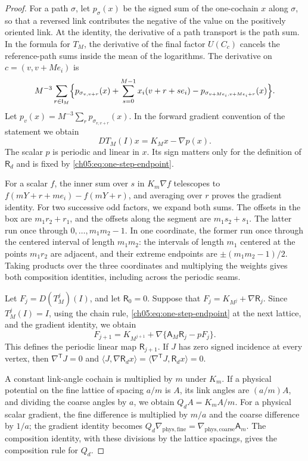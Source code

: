 \begin{proof}
For a path $\sigma$, let $p_\sigma(x)$ be the signed sum of the one-cochain $x$ along $\sigma$, so that a reversed link contributes the negative of the value on the positively oriented link. At the identity, the derivative of a path transport is the path sum. In the formula for $T_M$, the derivative of the final factor $U(C_c)$ cancels the reference-path sums inside the mean of the logarithms. The derivative on $c=(v,v+Me_i)$ is
\[
 M^{-3}\sum_{r\in\mathsf I_M}\Bigl\{p_{\sigma_{v,v+r}}(x)+\sum_{s=0}^{M-1}x_i(v+r+se_i)-p_{\sigma_{v+Me_i,v+Me_i+r}}(x)\Bigr\}.
\]
Let $p_v(x)=M^{-3}\sum_rp_{\sigma_{v,v+r}}(x)$. In the forward gradient convention of the statement we obtain
\begin{equation}\label{ch05:eq:one-step-endpoint}
 DT_M(I)x=K_Mx-\nabla p(x).
\end{equation}
The scalar $p$ is periodic and linear in $x$. Its sign matters only for the definition of $\mathsf R_d$ and is fixed by \eqref{ch05:eq:one-step-endpoint}.

For a scalar $f$, the inner sum over $s$ in $K_m\nabla f$ telescopes to $f(mY+r+me_i)-f(mY+r)$, and averaging over $r$ proves the gradient identity. For two successive odd factors, we expand both sums. The offsets in the box are $m_1r_2+r_1$, and the offsets along the segment are $m_1s_2+s_1$. The latter run once through $0,\ldots,m_1m_2-1$. In one coordinate, the former run once through the centered interval of length $m_1m_2$: the intervals of length $m_1$ centered at the points $m_1r_2$ are adjacent, and their extreme endpoints are $\pm(m_1m_2-1)/2$. Taking products over the three coordinates and multiplying the weights gives both composition identities, including across the periodic seams.

Let $F_j=D(T_M^j)(I)$, and let $\mathsf R_0=0$. Suppose that $F_j=K_{M^j}+\nabla\mathsf R_j$. Since $T_M^j(I)=I$, using the chain rule, \eqref{ch05:eq:one-step-endpoint} at the next lattice, and the gradient identity, we obtain
\[
 F_{j+1}=K_{M^{j+1}}+\nabla\{\mathsf A_M\mathsf R_j-pF_j\}.
\]
This defines the periodic linear map $\mathsf R_{j+1}$. If $J$ has zero signed incidence at every vertex, then $\nabla^{\mathsf T}J=0$ and $\langle J,\nabla\mathsf R_dx\rangle=\langle\nabla^{\mathsf T}J,\mathsf R_dx\rangle=0$.

A constant link-angle cochain is multiplied by $m$ under $K_m$. If a physical potential on the fine lattice of spacing $a/m$ is $A$, its link angles are $(a/m)A$, and dividing the coarse angles by $a$, we obtain $Q_dA=K_mA/m$. For a physical scalar gradient, the fine difference is multiplied by $m/a$ and the coarse difference by $1/a$; the gradient identity becomes $Q_d\nabla_{\mathrm{phys,fine}}=\nabla_{\mathrm{phys,coarse}}\mathsf A_m$. The composition identity, with these divisions by the lattice spacings, gives the composition rule for $Q_d$.


\end{proof}
